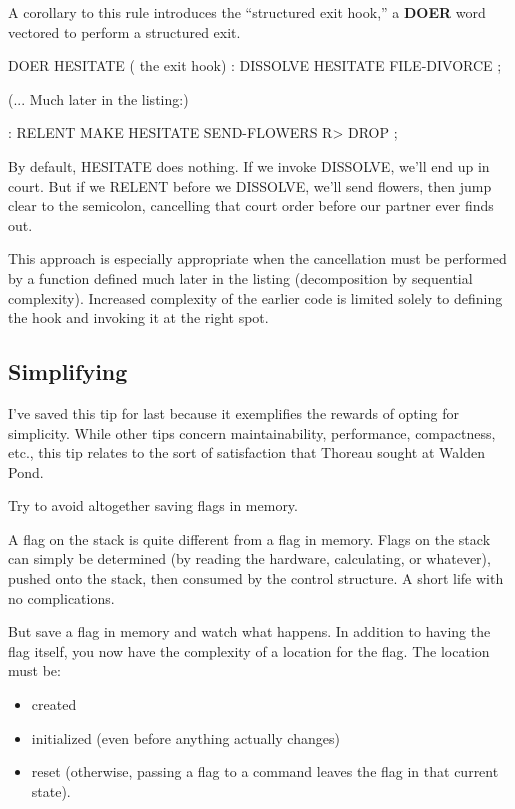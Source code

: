 A corollary to this rule introduces the ``structured exit hook,'' a
\textbf{DOER} word vectored to perform a structured exit.

\begin{Code}
DOER HESITATE  ( the exit hook)
: DISSOLVE   HESITATE  FILE-DIVORCE ;
\end{Code}
(... Much later in the listing:)
\begin{Code}
: RELENT   MAKE HESITATE   SEND-FLOWERS  R> DROP ;
\end{Code}
By default, HESITATE does nothing. If we invoke DISSOLVE, we'll
end up in court. But if we RELENT before we DISSOLVE, we'll send
flowers, then jump clear to the semicolon, cancelling that court order
before our partner ever finds out.

This approach is especially appropriate when the cancellation must
be performed by a function defined much later in the listing (decomposition
by sequential complexity). Increased complexity of the earlier code is
limited solely to defining the hook and invoking it at the right spot.

\subsection{Simplifying}

I've saved this tip for last because it exemplifies the rewards of opting for
simplicity. While other tips concern maintainability, performance,
compactness, etc., this tip relates to the sort of satisfaction that Thoreau
sought at Walden Pond.

\begin{tip}
Try to avoid altogether saving flags in memory.
\end{tip}
A flag on the stack is quite different from a flag in memory. Flags on the
stack can simply be determined (by reading the hardware, calculating, or
whatever), pushed onto the stack, then consumed by the control structure.
A short life with no complications.

But save a flag in memory and watch what happens. In addition to
having the flag itself, you now have the complexity of a location for the
flag. The location must be:

\begin{itemize}
\item created
\item initialized (even before anything actually changes)
\item reset (otherwise, passing a flag to a command leaves the flag in that current
state).
\end{itemize}

